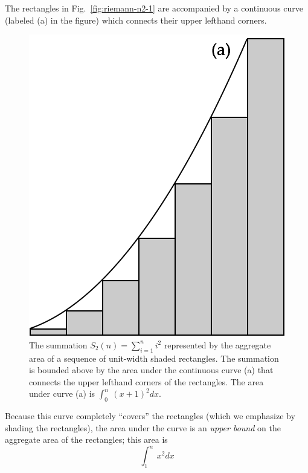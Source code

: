 \begin{enumerate}
The rectangles in Fig.~\ref{fig:riemann-n2-1} are accompanied by a
continuous curve (labeled (a) in the figure) which connects their
upper lefthand corners.
\begin{figure}[htb]
\centerline{
\includegraphics[scale=0.3]{FiguresMaths/SumSquaresContinuous1}
}
\caption{The summation $S_2(n) = \sum_{i=1}^n i^2$ represented by the
  aggregate area of a sequence of unit-width shaded rectangles.  The
  summation is bounded above by the area under the continuous curve (a)
  that connects the upper lefthand corners of the rectangles.  The
  area under curve (a) is $\int_0^n \ (x+1)^2 dx$.  }
\label{fig:riemann-n2-1}
\label{fig:SumIntegral1}
\end{figure}
Because this curve completely ``covers'' the rectangles (which we
emphasize by shading the rectangles), the area under the curve is an
{\em upper bound} on the aggregate area of the rectangles; this area
is
\[ \int_1^n \ x^2 dx \]


\end{enumerate}
